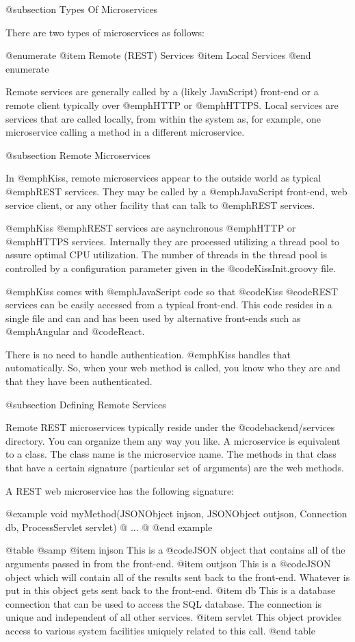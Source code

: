 @subsection Types Of Microservices

There are two types of microservices as follows:

@enumerate
@item
Remote (REST) Services
@item
Local Services
@end enumerate

Remote services are generally called by a (likely JavaScript)
front-end or a remote client typically over @emph{HTTP} or
@emph{HTTPS}.  Local services are services that are called locally,
from within the system as, for example, one microservice calling a
method in a different microservice.

@subsection Remote Microservices

In @emph{Kiss}, remote microservices appear to the outside world as
typical @emph{REST} services.  They may be called by a
@emph{JavaScript} front-end, web service client, or any other facility
that can talk to @emph{REST} services.

@emph{Kiss} @emph{REST} services are asynchronous @emph{HTTP} or
@emph{HTTPS} services.  Internally they are processed utilizing a
thread pool to assure optimal CPU utilization.  The number of threads
in the thread pool is controlled by a configuration parameter given in
the @code{KissInit.groovy} file.

@emph{Kiss} comes with @emph{JavaScript} code so that @code{Kiss}
@code{REST} services can be easily accessed from a typical front-end.
This code resides in a single file and can and has been used by
alternative front-ends such as @emph{Angular} and @code{React}.

There is no need to handle authentication.  @emph{Kiss} handles that
automatically.  So, when your web method is called, you know who
they are and that they have been authenticated.

@subsection Defining Remote Services

Remote REST microservices typically reside under the
@code{backend/services} directory.  You can organize them any way you
like.  A microservice is equivalent to a class.  The class name is the
microservice name.  The methods in that class that have a certain
signature (particular set of arguments) are the web methods.

A REST web microservice has the following signature:

@example
void myMethod(JSONObject injson, 
              JSONObject outjson, 
              Connection db, 
              ProcessServlet servlet) @{
...
@}
@end example

@table @samp
@item injson
This is a @code{JSON} object that contains all of the arguments passed
in from the front-end.
@item outjson
This is a @code{JSON} object which will contain all of the results
sent back to the front-end.  Whatever is put in this object gets sent back to the front-end.
@item db
This is a database connection that can be used to access the SQL database.  The
connection is unique and independent of all other services.
@item servlet
This object provides access to various system facilities uniquely related
to this call.
@end table

